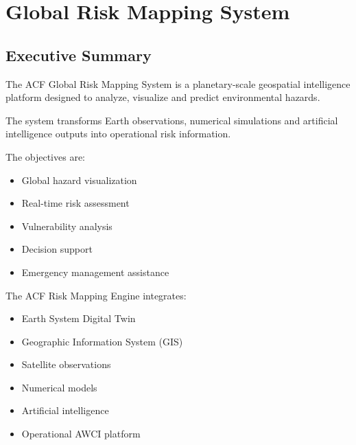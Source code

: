 
\section{Global Risk Mapping System}

\subsection{Executive Summary}

The ACF Global Risk Mapping System is a planetary-scale geospatial
intelligence platform designed to analyze, visualize and predict
environmental hazards.

The system transforms Earth observations, numerical simulations and
artificial intelligence outputs into operational risk information.

The objectives are:

\begin{itemize}

\item Global hazard visualization

\item Real-time risk assessment

\item Vulnerability analysis

\item Decision support

\item Emergency management assistance

\end{itemize}


The ACF Risk Mapping Engine integrates:

\begin{itemize}

\item Earth System Digital Twin

\item Geographic Information System (GIS)

\item Satellite observations

\item Numerical models

\item Artificial intelligence

\item Operational AWCI platform

\end{itemize}



